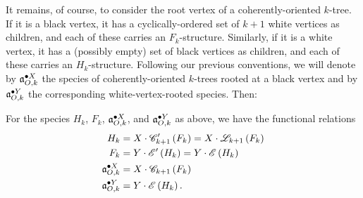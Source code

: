 \documentclass[sectionflow,singlespace,twoside,boldmathhdr]{brandiss} %
\numberwithin{section}{chapter}
\numberwithin{figure}{chapter}
\begin{document}
It remains, of course, to consider the root vertex of a coherently-oriented $k$-tree. If it is a black vertex, it has a cyclically-ordered set of $k+1$ white vertices as children, and each of these carries an $F_{k}$-structure. Similarly, if it is a white vertex, it has a (possibly empty) set of black vertices as children, and each of these carries an $H_{k}$-structure. Following our previous conventions, we will denote by $\pointed[X]{\mathfrak{a}}_{O, k}$ the species of coherently-oriented $k$-trees rooted at a black vertex and by $\pointed[Y]{\mathfrak{a}}_{O, k}$ the corresponding white-vertex-rooted species. Then:

\begin{theorem}\label{thm:funcdecompco}
  For the species $H_{k}$, $F_{k}$, $\pointed[X]{\mathfrak{a}}_{O, k}$, and $\pointed[Y]{\mathfrak{a}}_{O, k}$ as above, we have the functional relations
  \begin{align}
    H_{k} &= X \cdot \specname{C}'_{k+1} \pbrac{F_{k}} = X \cdot \specname{L}_{k+1} \pbrac{F_{k}} \label{eq:hfuncorig} \\
    F_{k} &= Y \cdot \specname{E}' \pbrac{H_{k}} = Y \cdot \specname{E} \pbrac{H_{k}} \label{eq:ffuncorig} \\
    \pointed[X]{\mathfrak{a}}_{O, k} &= X \cdot \specname{C}_{k+1} \pbrac{F_{k}} \label{eq:axfuncorig} \\
    \pointed[Y]{\mathfrak{a}}_{O, k} &= Y \cdot \specname{E} \pbrac{H_{k}} \label{eq:ayfuncorig}.
  \end{align}
\end{theorem}

\begin{comment} The complete proof is now embedded in the exposition.
\begin{proof}
  It is clear from the exposition above that equations \eqref{eq:axfuncorig} and \eqref{eq:ayfuncorig} must hold for some appropriate species $F_{k}$ and $H_{k}$; a coherently-oriented $k$-tree rooted at a front requires only an $X$-label and a set of attached hedron structures, while one rooted at a hedron requires only a $Y$-label and a $\pbrac{k+1}$-cycle of front structures.

  Consider now the species $H_{k}$ of hedron structures adjoined to an existing front.
  The hedron itself needs an $X$-label, and in addition it requires a cyclically-ordered collection of fronts ($F_{k}$-structures).
  However, the front to which the hedron is attached is already labeled; thus, the collection of fronts \emph{not} already labeled has a $\specname{C}'_{k+1}$-structure, where the $'$ denotes the species derivative as in \cite[\S 1.4]{bll:species}.
  Accordingly, we obtain equation \eqref{eq:hfuncorig}.

  Equation \eqref{eq:ffuncorig} follows similarly, with the additional observation that the hedra attached to a given front have only the structure of a set.
  We also note that $\specname{E}' = \specname{E}$ and that $\specname{C}'_{k+1} = \specname{L}_{k}$ (the species of linear orderings of $k$ elements) to simplify future calculations.
\end{proof}
\end{comment}
\end{document}
